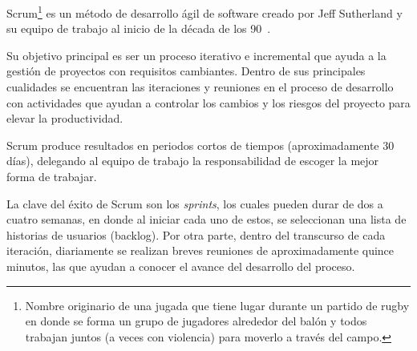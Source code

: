 Scrum\footnote{Nombre originario  de una jugada que tiene lugar durante un partido de rugby en donde se forma un grupo de jugadores alrededor del balón y todos trabajan juntos (a veces con violencia) para moverlo a través del campo. } es un método de desarrollo ágil de software creado por Jeff Sutherland y su equipo de trabajo al inicio de la década de los 90~\cite{7}.

Su objetivo principal es ser un proceso iterativo e incremental que ayuda a la gestión de proyectos con requisitos cambiantes. Dentro de sus principales cualidades se encuentran las iteraciones y reuniones en el proceso de desarrollo con actividades que ayudan a controlar los cambios y los riesgos del proyecto para elevar la productividad.

Scrum produce resultados en periodos cortos de tiempos (aproximadamente 30 días), delegando al equipo de trabajo la responsabilidad de escoger la mejor forma de trabajar.

La clave del éxito de Scrum son los \emph{sprints}, los cuales pueden durar de dos a cuatro semanas, en donde al iniciar cada uno de estos, se seleccionan una lista de historias de usuarios (backlog). Por otra parte, dentro del transcurso de cada iteración, diariamente se realizan breves reuniones de aproximadamente quince minutos, las que ayudan a conocer el avance del desarrollo del proceso.

